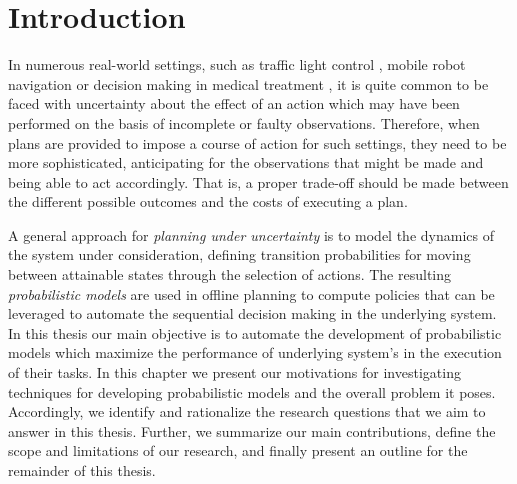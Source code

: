 \chapter{Introduction}
\label{ch:introduction}

In numerous real-world settings, such as traffic light control \cite{wiering2004intelligent}, mobile robot navigation \cite{MartinezCantin2009} or decision making in medical treatment \cite{schaefer2005modeling}, it is quite common to be faced with uncertainty about the effect of an action which may have been performed on the basis of incomplete or faulty observations.
Therefore, when plans are provided to impose a course of action for such settings, they need to be more sophisticated, anticipating for the observations that might be made and being able to act accordingly.
That is, a proper trade-off should be made between the different possible outcomes and the costs of executing a plan.

A general approach for \textit{planning under uncertainty} is to model the dynamics of the system under consideration, defining transition probabilities for moving between attainable states through the selection of actions.
The resulting \textit{probabilistic models} are used in offline planning to compute policies that can be leveraged to automate the sequential decision making in the underlying system.
In this thesis our main objective is to automate the development of probabilistic models which maximize the performance of underlying system's in the execution of their tasks.
In this chapter we present our motivations for investigating techniques for developing probabilistic models and the overall problem it poses.
Accordingly, we identify and rationalize the research questions that we aim to answer in this thesis.
Further, we summarize our main contributions, define the scope and limitations of our research, and finally present an outline for the remainder of this thesis.

